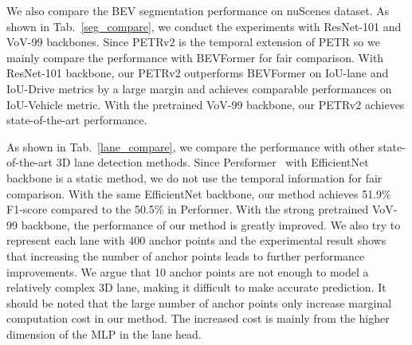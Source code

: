 \documentclass[10pt,twocolumn,letterpaper]{article}
\begin{document}
We also compare the BEV segmentation performance on nuScenes dataset. As shown in Tab.~\ref{seg_compare}, we conduct the experiments with ResNet-101 and VoV-99 backbones. Since PETRv2 is the temporal extension of PETR so we mainly compare the performance with BEVFormer for fair comparison. With ResNet-101 backbone, our PETRv2 outperforms BEVFormer on IoU-lane and IoU-Drive metrics by a large margin and achieves comparable performances on IoU-Vehicle metric. With the pretrained VoV-99 backbone, our PETRv2 achieves state-of-the-art performance.


As shown in Tab.~\ref{lane_compare}, we compare the performance with other state-of-the-art 3D lane detection methods. Since Persformer~\cite{chen2022persformer} with EfficientNet backbone is a static method, we do not use the temporal information for fair comparison. With the same EfficientNet backbone, our method achieves 51.9\% F1-score compared to the 50.5\% in Performer. With the strong pretrained VoV-99 backbone, the performance of our method is greatly improved. We also try to represent each lane with 400 anchor points and the experimental result shows that increasing the number of anchor points leads to further performance improvements. We argue that 10 anchor points are not enough to model a relatively complex 3D lane, making it difficult to make accurate prediction. It should be noted that the large number of anchor points only increase marginal computation cost in our method. The increased cost is mainly from the higher dimension of the MLP in the lane head.
\end{document}
